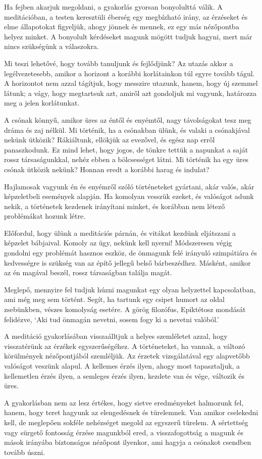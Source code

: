 Ha fejben akarjuk megoldani, a gyakorlás gyorsan bonyolulttá válik. A
meditációban, a testen keresztüli éberség egy megbízható irány, az
érzéseket és elme állapotokat figyeljük, ahogy jönnek és mennek, ez egy
más nézőpontba helyez minket. A bonyolult kérdéseket magunk mögött
tudjuk hagyni, mert már nincs szükségünk a válaszokra.

Mi teszi lehetővé, hogy tovább tanuljunk és fejlődjünk? Az utazás akkor
a legélvezetesebb, amikor a horizont a korábbi korlátainkon túl egyre
tovább tágul. A horizontot nem azzal tágítjuk, hogy messzire utazunk,
hanem, hogy új szemmel látunk; a vágy, hogy megtartsuk azt, amiről azt
gondoljuk mi vagyunk, határozza meg a jelen korlátunkat.

A csónak könnyű, amikor üres az éntől és enyémtől, nagy távolságokat
tesz meg dráma és zaj nélkül. Mi történik, ha a csónakban ülünk, és
valaki a csónakjával nekünk ütközik? Rákiáltunk, ellökjük az evezővel,
és egész nap erről panaszkodunk. Ez mind lehet, hogy jogos, de tönkre
tettük a napunkat a saját rossz társaságunkkal, nehéz ebben a
bölcsességet látni. Mi történik ha egy üres csónak ütközik nekünk?
Honnan eredt a korábbi harag és indulat?

Hajlamosak vagyunk én és enyémről szóló történeteket gyártani, akár
valós, akár képzeletbeli események alapján. Ha komolyan vesszük ezeket,
és valóságot adunk nekik, a történetek kezdenek irányítani minket, és
korábban nem létező problémákat hozunk létre.

Előfordul, hogy ülünk a meditációs párnán, és vitákat kezdünk eljátszani
a képzelet bábjaival. Komoly az ügy, nekünk kell nyerni! Módszeresen
végig gondolni egy problémát hasznos eszköz, de önmagunk felé irányuló
szimpátiára és kedvességre is szükség van az építő jellegű belső
bárbeszédhez. Másként, amikor az én magával beszél, rossz társaságban
találja magát.

Meglepő, mennyire fel tudjuk húzni magunkat egy olyan helyzettel
kapcsolatban, ami még meg sem történt. Segít, ha tartunk egy csipet
humort az oldal zsebünkben, vészes komolyság esetére. A görög filozófus,
Epiktétosz mondását felidézve, `Aki tud önmagán nevetni, sosem fogy ki a
nevetni valóból.'

A meditáció gyakorlásában visszaálltjuk a helyes szemléletet azzal, hogy
visszatérünk az érzékek egyszerűségéhez. A történeteket, ha vannak, a
változó körülmények nézőpontjából szemléljük. Az érzetek vizsgálatával
egy alapvetőbb valóságot veszünk alapul. A kellemes érzés ilyen, ahogy
most tapasztaljuk, a kellemetlen érzés ilyen, a semleges érzés ilyen,
kezdete van és vége, változik és üres.

A gyakorlásban nem az lesz értékes, hogy sietve eredményeket halmozunk
fel, hanem, hogy teret hagyunk az elengedésnek és türelemnek. Van amikor
cselekedni kell, de meglepően sokféle nehézséget megold az egyszerű
türelem. A sértettség vagy sürgető fontosság érzése magunkból ered, a
visszafogottság a magunk és mások irányába biztonságos nézőpont
ilyenkor, ami hagyja a csónakot csendben tovább úszni.
